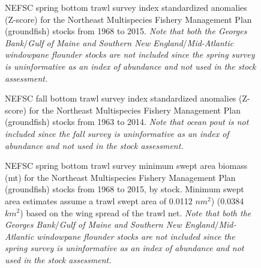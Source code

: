 	\begin{figure}
		\centering	
		\captionsetup{singlelinecheck=off}
		\caption[.]{NEFSC spring bottom trawl survey index standardized anomalies (Z-score) for the Northeast Multispecies Fishery Management Plan (groundfish) stocks from 1968 to 2015. \textit{Note that both the Georges Bank$/$Gulf of Maine and Southern New England$/$Mid-Atlantic windowpane flounder stocks are not included since the spring survey is uninformative as an index of abundance and not used in the stock assessment.}	}	
		\label{nefscSpringResiduals}
	\end{figure}
	\clearpage



	\begin{figure}
		\centering	
		\captionsetup{singlelinecheck=off}
		\caption[.]{NEFSC fall bottom trawl survey index standardized anomalies (Z-score) for the Northeast Multispecies Fishery Management Plan (groundfish) stocks from 1963 to 2014. \textit{Note that ocean pout is not included since the fall survey is uninformative as an index of abundance and not used in the stock assessment.}	}	
		\label{nefscFallResiduals}
	\end{figure}
	\clearpage




	\begin{figure}
		\centering	
		\captionsetup{singlelinecheck=off}
		\caption[.]{NEFSC spring bottom trawl survey minimum swept area biomass (mt) for the Northeast Multispecies Fishery Management Plan (groundfish) stocks from 1968 to 2015, by stock. Minimum swept area estimates assume a trawl swept area of 0.0112 $nm^{2}$) (0.0384 $km^{2}$) based on the wing spread of the trawl net. \textit{Note that both the Georges Bank$/$Gulf of Maine and Southern New England$/$Mid-Atlantic windowpane flounder stocks are not included since the spring survey is uninformative as an index of abundance and not used in the stock assessment.}	}	
		\label{nefscSpringMinSweptAreaBiomass}
	\end{figure}
	\clearpage


